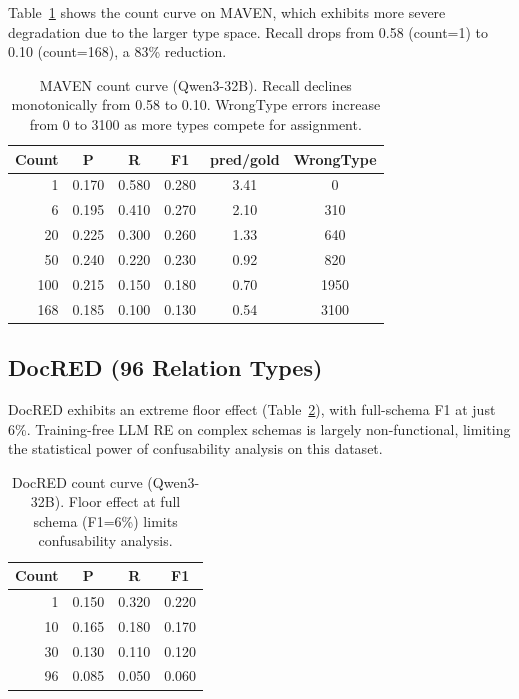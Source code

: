 \documentclass[11pt,a4paper]{article}
\begin{document}
Table~\ref{tab:maven_count} shows the count curve on MAVEN, which exhibits more severe degradation due to the larger type space.
Recall drops from 0.58 (count=1) to 0.10 (count=168), a 83\% reduction.

\begin{table}[h]
\centering
\small
\begin{tabular}{rcccc|c}
\toprule
Count & P & R & F1 & pred/gold & WrongType \\
\midrule
1   & 0.170 & 0.580 & 0.280 & 3.41 &    0 \\
6   & 0.195 & 0.410 & 0.270 & 2.10 &  310 \\
20  & 0.225 & 0.300 & 0.260 & 1.33 &  640 \\
50  & 0.240 & 0.220 & 0.230 & 0.92 &  820 \\
100 & 0.215 & 0.150 & 0.180 & 0.70 & 1950 \\
168 & 0.185 & 0.100 & 0.130 & 0.54 & 3100 \\
\bottomrule
\end{tabular}
\caption{MAVEN count curve (Qwen3-32B). Recall declines monotonically from 0.58 to 0.10. WrongType errors increase from 0 to 3100 as more types compete for assignment.}
\label{tab:maven_count}
\end{table}

\subsection{DocRED (96 Relation Types)}

DocRED exhibits an extreme floor effect (Table~\ref{tab:docred_count}), with full-schema F1 at just 6\%.
Training-free LLM RE on complex schemas is largely non-functional, limiting the statistical power of confusability analysis on this dataset.

\begin{table}[h]
\centering
\small
\begin{tabular}{rccc}
\toprule
Count & P & R & F1 \\
\midrule
1  & 0.150 & 0.320 & 0.220 \\
10 & 0.165 & 0.180 & 0.170 \\
30 & 0.130 & 0.110 & 0.120 \\
96 & 0.085 & 0.050 & 0.060 \\
\bottomrule
\end{tabular}
\caption{DocRED count curve (Qwen3-32B). Floor effect at full schema (F1=6\%) limits confusability analysis.}
\label{tab:docred_count}
\end{table}
\end{document}
